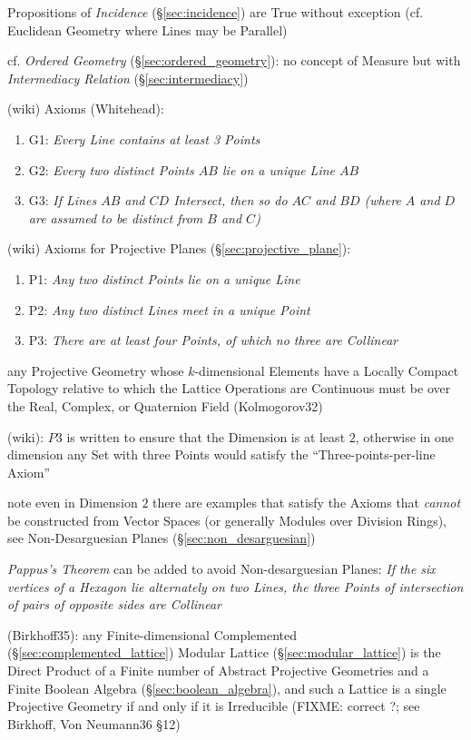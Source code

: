 Propositions of \emph{Incidence} (\S\ref{sec:incidence}) are True without
exception (cf. Euclidean Geometry where Lines may be Parallel)

\fist cf. \emph{Ordered Geometry} (\S\ref{sec:ordered_geometry}): no concept of
Measure but with \emph{Intermediacy Relation} (\S\ref{sec:intermediacy})

(wiki) Axioms (Whitehead):
\begin{enumerate}
  \item G1: \emph{Every Line contains at least 3 Points}
  \item G2: \emph{Every two distinct Points $AB$ lie on a unique Line $AB$}
  \item G3: \emph{If Lines $AB$ and $CD$ Intersect, then so do $AC$ and $BD$
    (where $A$ and $D$ are assumed to be distinct from $B$ and $C$)}
\end{enumerate}

(wiki) Axioms for Projective Planes (\S\ref{sec:projective_plane}):
\begin{enumerate}
  \item P1: \emph{Any two distinct Points lie on a unique Line}
  \item P2: \emph{Any two distinct Lines meet in a unique Point}
  \item P3: \emph{There are at least four Points, of which no three are
    Collinear}
\end{enumerate}

any Projective Geometry whose $k$-dimensional Elements have a Locally Compact
Topology relative to which the Lattice Operations are Continuous must be over
the Real, Complex, or Quaternion Field (Kolmogorov32)

(wiki): $P3$ is written to ensure that the Dimension is at least $2$, otherwise
in one dimension any Set with three Points would satisfy the
``Three-points-per-line Axiom''

note even in Dimension $2$ there are examples that satisfy the Axioms that
\emph{cannot} be constructed from Vector Spaces (or generally Modules over
Division Rings), see Non-Desarguesian Planes (\S\ref{sec:non_desarguesian})

\emph{Pappus's Theorem} can be added to avoid Non-desarguesian Planes:
\emph{If the six vertices of a Hexagon lie alternately on two Lines, the three
Points of intersection of pairs of opposite sides are Collinear}

(Birkhoff35): any Finite-dimensional Complemented
(\S\ref{sec:complemented_lattice}) Modular Lattice (\S\ref{sec:modular_lattice})
is the Direct Product of a Finite number of Abstract Projective Geometries and a
Finite Boolean Algebra (\S\ref{sec:boolean_algebra}), and such a
Lattice is a single Projective Geometry if and only if it is Irreducible
(FIXME: correct ?; see Birkhoff, Von Neumann36 \S 12)

